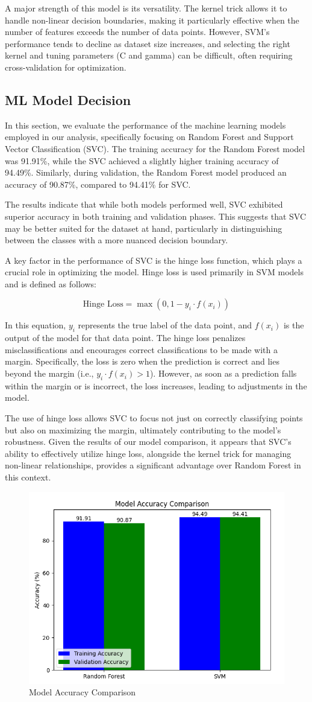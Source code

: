 \documentclass{article}
\begin{document}
A major strength of this model is its versatility. The kernel trick allows it to handle non-linear decision boundaries, making it particularly effective when the number of features exceeds the number of data points. However, SVM's performance tends to decline as dataset size increases, and selecting the right kernel and tuning parameters (C and gamma) can be difficult, often requiring cross-validation for optimization.

\subsection{ML Model Decision}

In this section, we evaluate the performance of the machine learning models employed in our analysis, specifically focusing on Random Forest and Support Vector Classification (SVC). The training accuracy for the Random Forest model was 91.91\%, while the SVC achieved a slightly higher training accuracy of 94.49\%. Similarly, during validation, the Random Forest model produced an accuracy of 90.87\%, compared to 94.41\% for SVC. 

The results indicate that while both models performed well, SVC exhibited superior accuracy in both training and validation phases. This suggests that SVC may be better suited for the dataset at hand, particularly in distinguishing between the classes with a more nuanced decision boundary.

A key factor in the performance of SVC is the hinge loss function, which plays a crucial role in optimizing the model. Hinge loss is used primarily in SVM models and is defined as follows:

\[
\text{Hinge Loss} = \max(0, 1 - y_i \cdot f(x_i))
\]

In this equation, \(y_i\) represents the true label of the data point, and \(f(x_i)\) is the output of the model for that data point. The hinge loss penalizes misclassifications and encourages correct classifications to be made with a margin. Specifically, the loss is zero when the prediction is correct and lies beyond the margin (i.e., \(y_i \cdot f(x_i) > 1\)). However, as soon as a prediction falls within the margin or is incorrect, the loss increases, leading to adjustments in the model.

The use of hinge loss allows SVC to focus not just on correctly classifying points but also on maximizing the margin, ultimately contributing to the model’s robustness. Given the results of our model comparison, it appears that SVC's ability to effectively utilize hinge loss, alongside the kernel trick for managing non-linear relationships, provides a significant advantage over Random Forest in this context.


\begin{figure}
    \centering
    \includegraphics[width=0.5\linewidth]{Figure_1.png}
    \caption{Model Accuracy Comparison}
    \label{fig:enter-label}
\end{figure}
\end{document}
